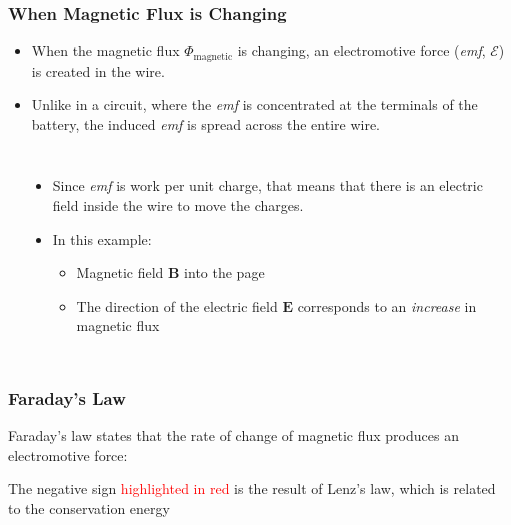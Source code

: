 \documentclass[12pt,aspectratio=169]{beamer}
\newcommand{\mb}[1]{\mathbf{#1}}
\newcommand{\eq}[2]{\vspace{#1}{\Large\begin{displaymath}#2\end{displaymath}}}
\begin{document}
\begin{frame}
  \frametitle{When Magnetic Flux is Changing}

  \begin{itemize}
  \item When the magnetic flux $\Phi_{\textrm{magnetic}}$ is changing, an
    electromotive force (\emph{emf}, $\mathcal{E}$) is created in the wire.
  \item Unlike in a circuit, where the \emph{emf} is concentrated at the
    terminals of the battery, the induced \emph{emf} is spread across the
    entire wire.
  \end{itemize}
  \begin{columns}
    \begin{center}
    \end{center}
    
    \begin{itemize}
    \item Since \emph{emf} is work per unit charge, that means that there is an
      electric field inside the wire to move the charges.
    \item In this example:
      \begin{itemize}
      \item Magnetic field $\mb{B}$ into the page
      \item The direction of the electric field $\mb{E}$ corresponds to an
        \emph{increase} in magnetic flux
      \end{itemize}
    \end{itemize}
  \end{columns}
\end{frame}


\begin{frame}
  \frametitle{Faraday's Law}
  Faraday's law states that the rate of change of magnetic flux produces an
  electromotive force:

  \eq{-.3in}{
    \boxed{
      \mathcal{E}=\oint\mb{E}\cdot d\mb{l}={\color{red}{-}}\frac{d\Phi}{dt}
    }
  }
  
  The negative sign {\textcolor{red}{highlighted in red}} is the result of
  Lenz's law, which is related to the conservation energy
\end{frame}
\end{document}

